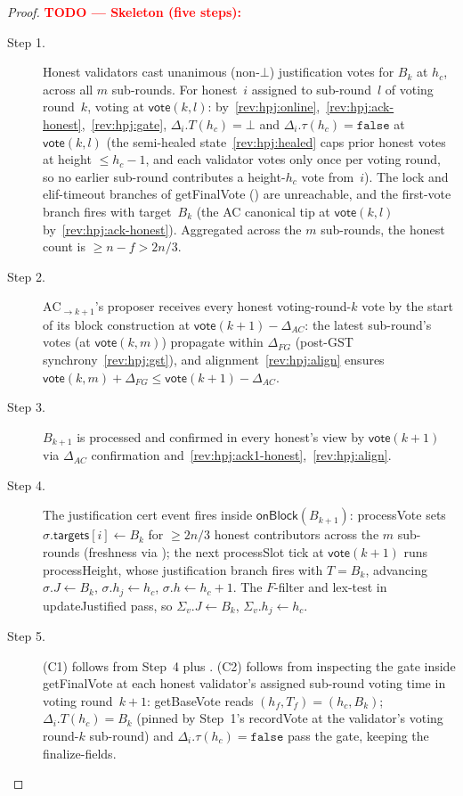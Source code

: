 \ifx\litemode\undefined\documentclass{article}\fi
\newcommand{\targets}{\mathsf{targets}}
\newcommand{\processSlot}{\textsf{processSlot}\xspace}
\newcommand{\processHeight}{\textsf{processHeight}\xspace}
\newcommand{\processVote}{\textsf{processVote}\xspace}
\newcommand{\vote}{\ensuremath{\mathsf{vote}}}
\newcommand{\getBaseVote}{\textsf{getBaseVote}\xspace}
\newcommand{\getFinalVote}{\textsf{getFinalVote}\xspace}
\newcommand{\recordVote}{\textsf{recordVote}\xspace}
\newcommand{\onBlock}{\textsf{onBlock}\xspace}
\newcommand{\updateJustified}{\textsf{updateJustified}\xspace}
\theoremstyle{plain}
\theoremstyle{definition}
\theoremstyle{remark}
\begin{document}
\begin{proof}
\textcolor{red}{\textbf{TODO --- Skeleton (five steps):}}
\begin{description}
\item[Step 1.] Honest validators cast unanimous (non-$\bot$) justification votes for $B_k$ at $h_c$, across all $m$ sub-rounds. For honest~$i$ assigned to sub-round~$l$ of voting round~$k$, voting at $\vote(k, l)$: by~\ref{rev:hpj:online},~\ref{rev:hpj:ack-honest},~\ref{rev:hpj:gate}, $\Delta_i.T(h_c) = \bot$ and $\Delta_i.\tau(h_c) = \mathtt{false}$ at $\vote(k, l)$ (the semi-healed state~\ref{rev:hpj:healed} caps prior honest votes at height $\leq h_c - 1$, and each validator votes only once per voting round, so no earlier sub-round contributes a height-$h_c$ vote from~$i$). The lock and elif-timeout branches of \getFinalVote{} () are unreachable, and the first-vote branch fires with target~$B_k$ (the AC canonical tip at $\vote(k, l)$ by~\ref{rev:hpj:ack-honest}). Aggregated across the $m$ sub-rounds, the honest count is $\geq n - f > 2n/3$.
\item[Step 2.] $\mathrm{AC}_{\to k+1}$'s proposer receives every honest voting-round-$k$ vote by the start of its block construction at $\vote(k+1) - \Delta_{\mathit{AC}}$: the latest sub-round's votes (at $\vote(k, m)$) propagate within $\Delta_{\mathit{FG}}$ (post-GST synchrony~\ref{rev:hpj:gst}), and alignment~\ref{rev:hpj:align} ensures $\vote(k, m) + \Delta_{\mathit{FG}} \leq \vote(k+1) - \Delta_{\mathit{AC}}$.
\item[Step 3.] $B_{k+1}$ is processed and confirmed in every honest's view by $\vote(k+1)$ via $\Delta_{\mathit{AC}}$ confirmation and~\ref{rev:hpj:ack1-honest},~\ref{rev:hpj:align}.
\item[Step 4.] The justification cert event fires inside $\onBlock(B_{k+1})$: \processVote{} sets $\sigma.\targets[i] \gets B_k$ for $\geq 2n/3$ honest contributors across the $m$ sub-rounds (freshness via ); the next \processSlot{} tick at $\vote(k+1)$ runs \processHeight{}, whose justification branch fires with $T = B_k$, advancing $\sigma.J \gets B_k$, $\sigma.h_j \gets h_c$, $\sigma.h \gets h_c + 1$. The $F$-filter and lex-test in \updateJustified{} pass, so $\Sigma_v.J \gets B_k$, $\Sigma_v.h_j \gets h_c$.
\item[Step 5.] (C1) follows from Step~4 plus . (C2) follows from inspecting the gate inside \getFinalVote{} at each honest validator's assigned sub-round voting time in voting round~$k+1$: \getBaseVote{} reads $(h_f, T_f) = (h_c, B_k)$; $\Delta_i.T(h_c) = B_k$ (pinned by Step~1's \recordVote{} at the validator's voting round-$k$ sub-round) and $\Delta_i.\tau(h_c) = \mathtt{false}$ pass the gate, keeping the finalize-fields.
\end{description}
\end{proof}
\end{document}
